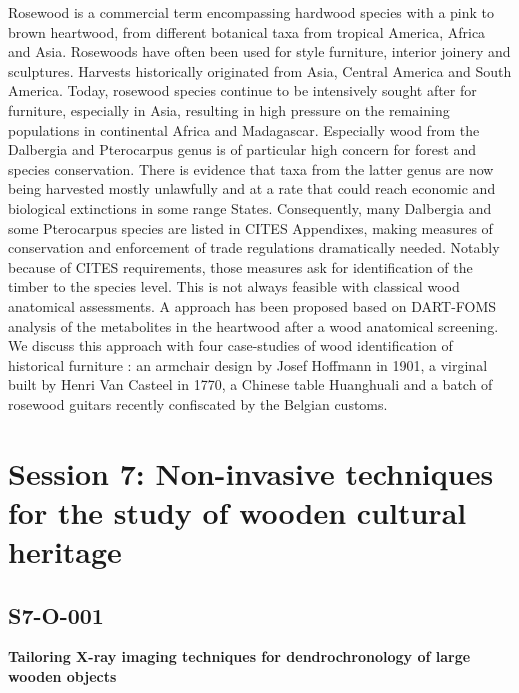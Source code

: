 \documentclass[
]{book}
\begin{document}
Rosewood is a commercial term encompassing hardwood species with a pink to brown heartwood, from different botanical taxa from tropical America, Africa and Asia. Rosewoods have often been used for style furniture, interior joinery and sculptures. Harvests historically originated from Asia, Central America and South America. Today, rosewood species continue to be intensively sought after for furniture, especially in Asia, resulting in high pressure on the remaining populations in continental Africa and Madagascar. Especially wood from the Dalbergia and Pterocarpus genus is of particular high concern for forest and species conservation. There is evidence that taxa from the latter genus are now being harvested mostly unlawfully and at a rate that could reach economic and biological extinctions in some range States. Consequently, many Dalbergia and some Pterocarpus species are listed in CITES Appendixes, making measures of conservation and enforcement of trade regulations dramatically needed. Notably because of CITES requirements, those measures ask for identification of the timber to the species level. This is not always feasible with classical wood anatomical assessments. A approach has been proposed based on DART-FOMS analysis of the metabolites in the heartwood after a wood anatomical screening. We discuss this approach with four case-studies of wood identification of historical furniture : an armchair design by Josef Hoffmann in 1901, a virginal built by Henri Van Casteel in 1770, a Chinese table Huanghuali and a batch of rosewood guitars recently confiscated by the Belgian customs.

\hypertarget{session-7-non-invasive-techniques-for-the-study-of-wooden-cultural-heritage}{%
\chapter*{Session 7: Non-invasive techniques for the study of wooden cultural heritage}\label{session-7-non-invasive-techniques-for-the-study-of-wooden-cultural-heritage}}

\hypertarget{s7-o-001}{%
\section*{S7-O-001}\label{s7-o-001}}

\textbf{Tailoring X-ray imaging techniques for dendrochronology of large wooden objects}
\end{document}
